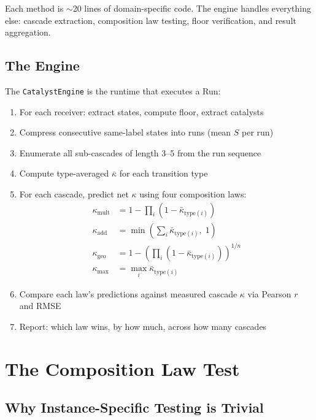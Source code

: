 \documentclass[11pt,a4paper]{article}
\theoremstyle{definition}
\theoremstyle{remark}
\begin{document}
Each method is $\sim$20 lines of domain-specific code. The engine handles everything else: cascade extraction, composition law testing, floor verification, and result aggregation.

\subsection{The Engine}

The \texttt{CatalystEngine} is the runtime that executes a Run:

\begin{enumerate}[nosep]
\item For each receiver: extract states, compute floor, extract catalysts
\item Compress consecutive same-label states into runs (mean $S$ per run)
\item Enumerate all sub-cascades of length 3--5 from the run sequence
\item Compute type-averaged $\bar{\kappa}$ for each transition type
\item For each cascade, predict net $\kappa$ using four composition laws:
\begin{align}
\kappa_{\mathrm{mult}} &= 1 - \prod_i (1 - \bar{\kappa}_{\mathrm{type}(i)}) \\
\kappa_{\mathrm{add}} &= \min\left(\sum_i \bar{\kappa}_{\mathrm{type}(i)},\; 1\right) \\
\kappa_{\mathrm{geo}} &= 1 - \left(\prod_i (1 - \bar{\kappa}_{\mathrm{type}(i)})\right)^{1/n} \\
\kappa_{\mathrm{max}} &= \max_i \bar{\kappa}_{\mathrm{type}(i)}
\end{align}
\item Compare each law's predictions against measured cascade $\kappa$ via Pearson $r$ and RMSE
\item Report: which law wins, by how much, across how many cascades
\end{enumerate}

\section{The Composition Law Test}
\label{sec:composition}

\subsection{Why Instance-Specific Testing is Trivial}
\end{document}
